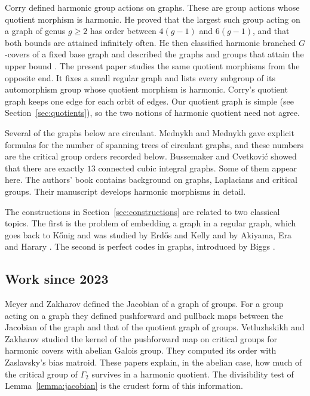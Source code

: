 \documentclass[12pt,letterpaper]{article}
\theoremstyle{definition}
\begin{document}
Corry \cite{Co11} defined harmonic group actions on graphs. These are group
actions whose quotient morphism is harmonic. He proved that the largest such
group acting on a graph of genus $g\geq 2$ has order between $4(g-1)$ and
$6(g-1)$, and that both bounds are attained infinitely often. He then
classified harmonic branched $G$-covers of a fixed base graph \cite{Co12} and
described the graphs and groups that attain the upper bound \cite{Co15}. The
present paper studies the same quotient morphisms from the opposite end. It
fixes a small regular graph and lists every subgroup of its automorphism
group whose quotient morphism is harmonic. Corry's quotient graph keeps one
edge for each orbit of edges. Our quotient graph is simple (see
Section~\ref{sec:quotients}), so the two notions of harmonic quotient need
not agree.

Several of the graphs below are circulant. Mednykh and Mednykh
\cite{MM19} gave explicit formulas for the number of spanning trees of
circulant graphs, and these numbers are the critical group orders recorded
below. Bussemaker and Cvetkovi\'c \cite{BC76} showed that there are exactly
$13$ connected cubic integral graphs. Some of them appear here. The authors'
book \cite{JM17} contains background on graphs, Laplacians and critical
groups. Their manuscript \cite{MJ22} develops harmonic morphisms in detail.

The constructions in Section~\ref{sec:constructions} are related to two
classical topics. The first is the problem of embedding a graph in a
regular graph, which goes back to K\H{o}nig \cite{Ko36} and was studied by
Erd\H{o}s and Kelly \cite{EK63} and by Akiyama, Era and Harary \cite{AEH83}.
The second is perfect codes in graphs, introduced by Biggs \cite{Bi73}.

\subsection{Work since 2023}

Meyer and Zakharov \cite{MZ23} defined the Jacobian of a graph of groups.
For a group acting on a graph they defined pushforward and pullback maps
between the Jacobian of the graph and that of the quotient graph of groups.
Vetluzhskikh and Zakharov \cite{VZ24} studied the kernel of the
pushforward map on critical groups for harmonic covers with abelian Galois
group. They computed its order with Zaslavsky's bias matroid. These papers
explain, in the abelian case, how much of the critical group of $\Gamma_2$
survives in a harmonic quotient. The divisibility test of
Lemma~\ref{lemma:jacobian} is the crudest form of this information.
\end{document}
